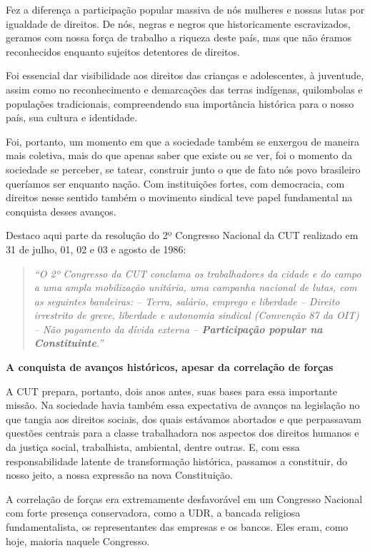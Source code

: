 Fez a diferença a participação popular massiva de nós mulheres e nossas
lutas por igualdade de direitos. De nós, negras e negros que
historicamente escravizados, geramos com nossa força de trabalho a
riqueza deste país, mas que não éramos reconhecidos enquanto sujeitos
detentores de direitos.

Foi essencial dar visibilidade aos direitos das crianças e adolescentes,
à juventude, assim como no reconhecimento e demarcações das terras
indígenas, quilombolas e populações tradicionais, compreendendo sua
importância histórica para o nosso país, sua cultura e identidade.

Foi, portanto, um momento em que a sociedade também se enxergou de
maneira mais coletiva, mais do que apenas saber que existe ou se ver,
foi o momento da sociedade se perceber, se tatear, construir junto o que
de fato nós povo brasileiro queríamos ser enquanto nação. Com
instituições fortes, com democracia, com direitos nesse sentido também o
movimento sindical teve papel fundamental na conquista desses avanços.

Destaco aqui parte da resolução do 2º Congresso Nacional da CUT
realizado em 31 de julho, 01, 02 e 03 e agosto de 1986:

\begin{quote}
\emph{``O 2º Congresso da CUT conclama os trabalhadores da cidade e do
campo a uma ampla mobilização unitária, uma campanha nacional de lutas,
com as seguintes bandeiras: -- Terra, salário, emprego e liberdade --
Direito irrestrito de greve, liberdade e autonomia sindical (Convenção
87 da OIT) -- Não pagamento da dívida externa -- \textbf{Participação
popular na Constituinte}.'' }
\end{quote}

\textbf{A conquista de avanços históricos, apesar da correlação de
forças }

A CUT prepara, portanto, dois anos antes, suas bases para essa
importante missão. Na sociedade havia também essa expectativa de avanços
na legislação no que tangia aos direitos sociais, dos quais estávamos
abortados e que perpassavam questões centrais para a classe trabalhadora
nos aspectos dos direitos humanos e da justiça social, trabalhista,
ambiental, dentre outras. E, com essa responsabilidade latente de
transformação histórica, passamos a constituir, do nosso jeito, a nossa
expressão na nova Constituição.

A correlação de forças era extremamente desfavorável em um Congresso
Nacional com forte presença conservadora, como a UDR, a bancada
religiosa fundamentalista, os representantes das empresas e os bancos.
Eles eram, como hoje, maioria naquele Congresso.

